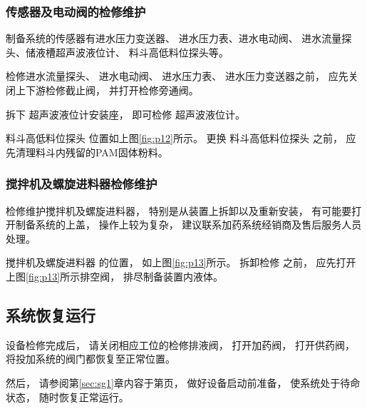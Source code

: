             

\newpage

        \subsubsection{传感器及电动阀的检修维护} 

         

            制备系统的传感器有进水压力变送器、
            进水压力表、进水电动阀、
            进水流量探头、储液槽超声波液位计、
            料斗高低料位探头等。

            \par 检修进水流量探头、
            进水电动阀、
            进水压力表、
            进水压力变送器之前，
            应先关闭上下游检修截止阀，
            并打开检修旁通阀。
            \par 拆下
            超声波液位计安装座， 
            即可检修
            超声波液位计。

            \newpage

            

            \par 料斗高低料位探头
            位置如上图\ref{fig:p12}所示。
            更换
            料斗高低料位探头
            之前，
            应先清理料斗内残留的PAM固体粉料。
        
        \subsubsection{搅拌机及螺旋进料器检修维护}
            检修维护搅拌机及螺旋进料器，
            特别是从装置上拆卸以及重新安装，
            有可能要打开制备系统的上盖，
            操作上较为复杂，
            建议联系加药系统经销商及售后服务人员处理。

            

            \par 搅拌机及螺旋进料器 的位置，
            如上图\ref{fig:p13}所示。
            拆卸检修 之前，
            应先打开上图\ref{fig:p13}所示排空阀，
            排尽制备装置内液体。

   \subsection{系统恢复运行}
        设备检修完成后，
        请关闭相应工位的检修排液阀，
        打开加药阀，
        打开供药阀，
        将投加系统的阀门都恢复至正常位置。
        \par 然后，
        请参阅第\ref{sec:sg1}章内容于第\pageref{sec:sg1}页，
        做好设备启动前准备，
        使系统处于待命状态，
        随时恢复正常运行。





